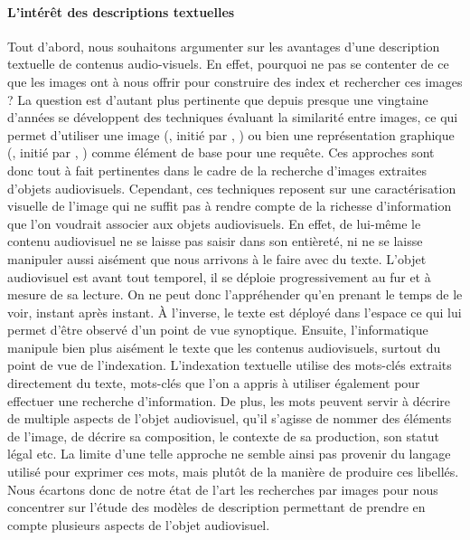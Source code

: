 \paragraph{L'intérêt des descriptions textuelles}
Tout d'abord, nous souhaitons argumenter sur les avantages d'une description textuelle de contenus audio-visuels. 
En effet, pourquoi ne pas se contenter de ce que les images ont à nous offrir pour construire des index et rechercher ces images ? 
La question est d'autant plus pertinente que depuis presque une vingtaine d'années se développent des techniques évaluant la similarité entre images, ce qui permet d'utiliser une image (, initié par \cite{Flickner1995}, \cite{Pentland1996}) ou bien une représentation graphique (, initié par \cite{Flickner1995}, \cite{Bach1996}) comme élément de base pour une requête.
Ces approches sont donc tout à fait pertinentes dans le cadre de la recherche d'images extraites d'objets audiovisuels. 
Cependant, ces techniques reposent sur une caractérisation visuelle de l'image qui ne suffit pas à rendre compte de la richesse d'information que l'on voudrait associer aux objets audiovisuels.
En effet, de lui-même le contenu audiovisuel ne se laisse pas saisir dans son entièreté, ni ne se laisse manipuler aussi aisément que nous arrivons à le faire avec du texte. 
L'objet audiovisuel est avant tout temporel, il se déploie progressivement au fur et à mesure de sa lecture. 
On ne peut donc l'appréhender qu'en prenant le temps de le voir, instant après instant. 
À l'inverse, le texte est déployé dans l'espace ce qui lui permet d'être observé d'un point de vue synoptique. 
Ensuite, l'informatique manipule  bien plus aisément le texte que les contenus audiovisuels, surtout du point de vue de l'indexation. 
L'indexation textuelle utilise des mots-clés extraits directement du texte, mots-clés que l'on a appris à utiliser également pour effectuer une recherche d'information. 
De plus, les mots peuvent servir à décrire de multiple aspects de l'objet audiovisuel, qu'il s'agisse de nommer des éléments de l'image, de décrire sa composition, le contexte de sa production, son statut légal etc.
La limite d'une telle approche ne semble ainsi pas provenir du langage utilisé pour exprimer ces mots, mais plutôt de la manière de produire ces libellés. 
Nous écartons donc de notre état de l'art les recherches par images pour nous concentrer sur l'étude des modèles de description permettant de prendre en compte plusieurs aspects de l'objet audiovisuel. 



